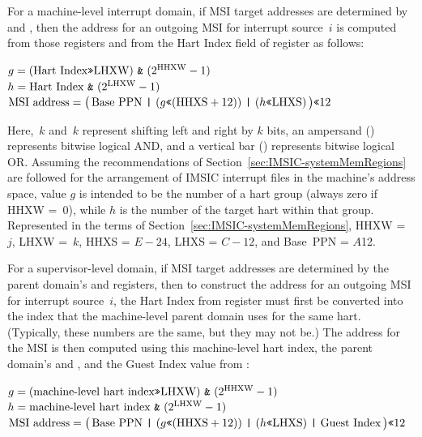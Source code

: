 For a machine-level interrupt domain, if MSI target addresses are
determined by  and , then the address
for an outgoing MSI for interrupt source~$i$ is computed from those
registers and from the Hart Index field of register  as
follows:
\begin{displayLinesTable}
$g =
  (\mbox{Hart Index\z{>>}LHXW})\mbox{ \z{\&} }(\mbox{2}^{\rm HHXW}-\mbox{1})$\\
$h = \mbox{Hart Index \z{\&} }(\mbox{2}^{\rm LHXW}-\mbox{1})$\\
$\mbox{MSI address} =
  \bigl(\,
    \mbox{Base PPN \z{|} }(g\mbox{\z{<<}}(\mbox{HHXS}+\mbox{12}))
      \mbox{ \z{|} }(h\mbox{\z{<<}LHXS})
  \,\bigr)\mbox{\z{<<}12}$
\end{displayLinesTable}
Here, \z{<<}$\,k$ and \z{>>}$\,k$ represent shifting left and right by
$k$ bits, an ampersand (\z{\&}) represents bitwise logical AND, and a
vertical bar (\z{|}) represents bitwise logical OR.
Assuming the recommendations of
Section~\ref{sec:IMSIC-systemMemRegions} are followed for the
arrangement of IMSIC interrupt files in the machine's address space,
value $g$ is intended to be the number of a hart group (always zero
if HHXW =~0), while $h$ is the number of the target hart within that
group.
Represented in the terms of Section~\ref{sec:IMSIC-systemMemRegions},
HHXW =~$j$, LHXW =~$k$, HHXS = ${E-24}$, LHXS = ${C-12}$, and
Base~PPN = $A$\z{>>}12.

For a supervisor-level domain, if MSI target addresses are determined
by the parent domain's  and  registers,
then to construct the address for an outgoing MSI for interrupt
source~$i$, the Hart Index from register  must first be
converted into the index that the machine-level parent domain uses for
the same hart.
(Typically, these numbers are the same, but they may not be.)
The address for the MSI is then computed using this machine-level hart
index, the parent domain's  and , and
the Guest Index value from :
\begin{displayLinesTable}
$g =
  (\mbox{machine-level hart index\z{>>}LHXW})
    \mbox{ \z{\&} }(\mbox{2}^{\rm HHXW}-\mbox{1})$\\
$h = \mbox{machine-level hart index \z{\&} }(\mbox{2}^{\rm LHXW}-\mbox{1})$\\
$\mbox{MSI address} =
  \bigl(\,
    \mbox{Base PPN \z{|} }(g\mbox{\z{<<}}(\mbox{HHXS}+\mbox{12}))
      \mbox{ \z{|} }(h\mbox{\z{<<}LHXS})\mbox{ \z{|} Guest Index}
  \,\bigr)\mbox{\z{<<}12}$
\end{displayLinesTable}

